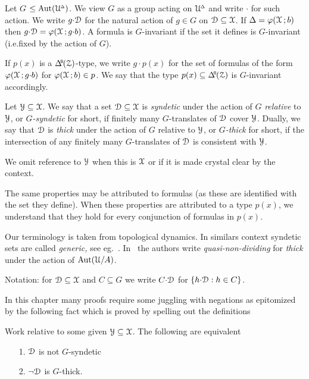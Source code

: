 Let \emph{$G$\/} $\le{\rm Aut}(\EuScript U\kern-.2ex^{\scriptscriptstyle\Delta})$.
We view $G$ as a group acting on $\EuScript U\kern-.2ex^{\scriptscriptstyle\Delta}$ and write ${\cdot}$ for such action.
We write $g{\cdot}\EuScript D$ for the natural action of $g\in G$ on $\EuScript D\subseteq\EuScript X$.
If $\Delta=\varphi(\EuScript X\,;b)$ then $g{\cdot}\EuScript D=\varphi(\EuScript X\,;g{\cdot}b)$.
A formula is $G$-invariant if the set it defines is $G$-invariant (i.e.\@ fixed by the action of $G$).

If $p(x)$ is a $\BDelta(\Z)$-type, we write $g{\cdot}p(x)$ for the set of formulas of the form $\varphi(\EuScript X\,;g{\cdot}b)$ for $\varphi(\EuScript X\,;b)\in p$.
We say that the type $p(x)\subseteq\BDelta(\Z)$ is $G$-invariant accordingly.

Let $\EuScript Y\subseteq\EuScript X$.
We say that a set $\EuScript D\subseteq\EuScript X$ is \emph{syndetic\/} under the action of $G$ \emph{relative\/} to $\EuScript Y$, or \emph{$G$-syndetic\/} for short, if finitely many $G$-translates of $\EuScript D$ cover $\EuScript Y$.
Dually, we say that $\EuScript D$ is \emph{thick\/} under the action of $G$ relative to $\EuScript Y$, or \emph{$G$-thick\/} for short, if the intersection of any finitely many $G$-translates of $\EuScript D$ is consistent with $\EuScript Y$.

We omit reference to $\EuScript Y$ when this is $\EuScript X$ or if it is made crystal clear by the context.

The same properties may be attributed to formulas (as these are identified with the set they define).
When these properties are attributed to a type $p(x)$, we understand that they hold for every conjunction of formulas in $p(x)$.

Our terminology is taken from topological dynamics.
In similars context syndetic sets are called \textit{generic,} see eg.~\cite{N09}.
In~\cite{CK} the authors write \textit{quasi-non-dividing\/} for \textit{thick\/} under the action of ${\rm Aut}(\EuScript U/A)$.

Notation: for $\EuScript D\subseteq\EuScript X$ and $C\subseteq G$ we write \emph{$C{\cdot}\EuScript D$\/} for $\{h{\cdot}\EuScript D: h\in C\}$.

In this chapter many proofs require some juggling with negations as epitomized by the following fact which is proved by spelling out the definitions

\begin{fact}\label{fact_fip}
  Work relative to some given $\EuScript Y\subseteq\EuScript X$.
  The following are equivalent
  \begin{itemize}
    \item[1.] $\EuScript D$ is not $G$-syndetic
    \item[2.] $\neg\EuScript D$ is $G$-thick.
  \end{itemize}\smallskip
\end{fact}

